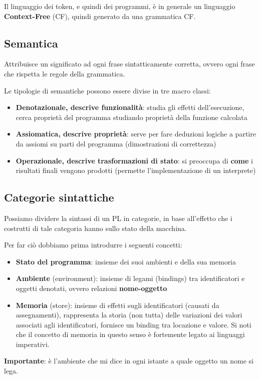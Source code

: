 \documentclass[12pt,a4paper]{article}
\begin{document}
Il linguaggio dei token, e quindi dei programmi, è in generale un linguaggio \textbf{Context-Free} (CF), quindi generato da una grammatica CF.
\subsection{Semantica}
Attribuisce un significato ad ogni frase sintatticamente corretta, ovvero ogni frase che rispetta le regole della grammatica.

Le tipologie di semantiche possono essere divise in tre macro classi:

\begin{itemize}
\item \textbf{Denotazionale, descrive funzionalità}: studia gli effetti dell'esecuzione, cerca proprietà del programma studiando proprietà della funzione calcolata
\item \textbf{Assiomatica, descrive proprietà}: serve per fare deduzioni logiche a partire da assiomi su parti del programma (dimostrazioni di correttezza)
\item \textbf{Operazionale, descrive trasformazioni di stato}:  si preoccupa di \textbf{come} i risultati finali vengono prodotti (permette l'implementazione di un interprete)

\end{itemize}

\subsection{Categorie sintattiche}
Possiamo dividere la sintassi di un PL in categorie, in base all'effetto che i costrutti di tale categoria hanno sullo stato della macchina.

Per far ciò dobbiamo prima introdurre i seguenti concetti:
\begin{itemize}
\item \textbf{Stato del programma}: insieme dei suoi ambienti e della sua memoria
\item \textbf{Ambiente} (environment): insieme di legami (bindings) tra identificatori e oggetti denotati, ovvero relazioni \textbf{nome-oggetto}
\item \textbf{Memoria} (store): insieme di effetti sugli identificatori (causati da assegnamenti), rappresenta la storia (non tutta) delle variazioni dei valori associati agli identificatori, fornisce un binding tra locazione e valore. Si noti che il concetto di memoria in questo senso è fortemente legato ai linguaggi imperativi.
\end{itemize}
\textbf{Importante}: è l'ambiente che mi dice in ogni istante a quale oggetto un nome si lega.
\end{document}
